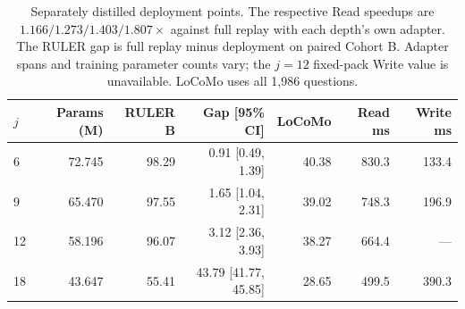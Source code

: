 \begin{table}[htbp]
\centering
\small
\setlength{\tabcolsep}{4pt}
\begin{tabular}{@{}lrrrrrr@{}}
\toprule
$j$ & Params (M) & RULER B & Gap [95\% CI] & LoCoMo & Read ms & Write ms \\
\midrule
6 & 72.745 & 98.29 & 0.91 [0.49, 1.39] & 40.38 & 830.3 & 133.4 \\
9 & 65.470 & 97.55 & 1.65 [1.04, 2.31] & 39.02 & 748.3 & 196.9 \\
12 & 58.196 & 96.07 & 3.12 [2.36, 3.93] & 38.27 & 664.4 & --- \\
18 & 43.647 & 55.41 & 43.79 [41.77, 45.85] & 28.65 & 499.5 & 390.3 \\
\bottomrule
\end{tabular}
\caption{Separately distilled deployment points. The respective Read speedups are $1.166/1.273/1.403/1.807\times$ against full replay with each depth's own adapter. The RULER gap is full replay minus deployment on paired Cohort B. Adapter spans and training parameter counts vary; the $j=12$ fixed-pack Write value is unavailable. LoCoMo uses all 1,986 questions.}
\label{tab:multidepth}
\end{table}
